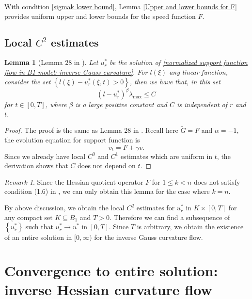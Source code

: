 \documentclass[reqno]{amsart}
\newtheorem{lemma}[theorem]{Lemma}
\theoremstyle{remark}
\newtheorem{remark}[theorem]{Remark}
\theoremstyle{definition}
\numberwithin{equation}{section}
\begin{document}
With condition \eqref{sigmak lower bound}, Lemma \ref{Upper and lower bounds for F} provides uniform upper and lower bounds for the speed function $F$. 


\subsection{Local \texorpdfstring{$C^2$}{C2} estimates}

\begin{lemma}[Lemma 28 in \cite{Entireconvexcurvatureflow}]
    Let $u^*_r$ be the solution of \eqref{normalized support function flow in B1 model: inverse Gauss curvature}. For $l(\xi)$ any linear function, consider the set $\left\{ l(\xi) - u^*_r(\xi, t) > 0 \right\}$, then we have that, in this set
    \[
    \left( l - u^*_r \right)^{\beta}\lambda_{\max} \leqslant C
    \]
    for $t \in [0, T]$, where $\beta$ is a large positive constant and $C$ is independent of $r$ and $t$.
\end{lemma}
\begin{proof}
    The proof is the same as Lemma 28 in \cite{Entireconvexcurvatureflow}. Recall here $\tilde{G} = F$ and $\alpha = -1$, the evolution equation for support function is
    \[
    v_t = F + \gamma v.
    \]
    Since we already have local $C^0$ and $C^1$ estimates which are uniform in $t$, the derivation shows that $C$ does not depend on $t$.
\end{proof}

\begin{remark}
    Since the Hessian quotient operator $F$ for $1 \leqslant k <n$ does not satisfy condition (1.6) in \cite{Entireconvexcurvatureflow}, we can only obtain this lemma for the case where $k=n$.
\end{remark}

By above discussion, we obtain the local $C^2$ estimates for $u^*_r$ in $K \times [0, T]$ for any compact set $K \subseteq B_1$ and $T>0$. Therefore we can find a subsequence of $\left\{ u^*_r \right\}$ such that $u^*_r \rightarrow u^*$ in $[0, T]$. Since $T$ is arbitrary, we obtain the existence of an entire solution in $[0, \infty)$ for the inverse Gauss curvature flow.


\section{Convergence to entire solution: inverse Hessian curvature flow}\label{Convergence to entire solution: inverse Hessian curvature flow}
\end{document}

